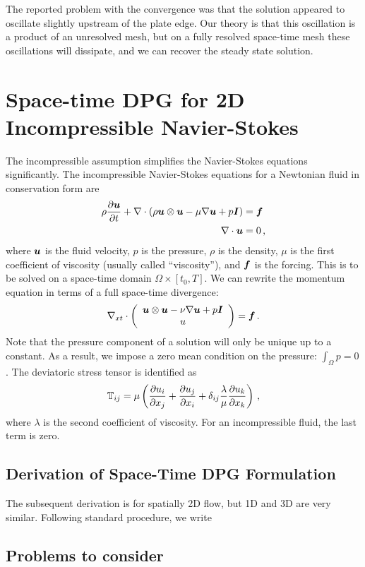 \documentclass[Proposal.tex]{subfiles}
\begin{document}
The reported problem with the convergence was that the solution appeared to oscillate slightly upstream of the plate edge.
Our theory is that this oscillation is a product of an unresolved mesh, but on a fully resolved space-time mesh these oscillations will dissipate, 
and we can recover the steady state solution.

\section{Space-time DPG for 2D Incompressible Navier-Stokes}
The incompressible assumption simplifies the Navier-Stokes equations significantly.
The incompressible Navier-Stokes equations for a Newtonian fluid in conservation form are
\begin{align*}
  \rho\frac{\partial\boldsymbol u}{\partial t}+\nabla\cdot\left( \rho\boldsymbol u\otimes\boldsymbol u-\mu\nabla\boldsymbol u+p\boldsymbol I \right)&=\boldsymbol f\\
  \nabla\cdot\boldsymbol u&=0\,,
\end{align*}
where $\boldsymbol u$ is the fluid velocity, $p$ is the pressure, $\rho$ is the density, $\mu$ is the first coefficient of viscosity (usually called ``viscosity''), 
and $\boldsymbol f$ is the forcing. 
This is to be solved on a space-time domain $\Omega\times[t_0,T]$.
We can rewrite the momentum equation in terms of a full space-time divergence:
\begin{equation}
\nabla_{xt}\cdot\left( \begin{array}{c} \boldsymbol u\otimes\boldsymbol u-\nu\nabla\boldsymbol u+p\boldsymbol I\\ u\\ \end{array} \right)=\boldsymbol f\,.
\end{equation}
Note that the pressure component of a solution will only be unique up to a constant. 
As a result, we impose a zero mean condition on the pressure: $\int_\Omega p=0$.
The deviatoric stress tensor is identified as
\begin{equation}
	\mathbb{T}_{ij}=\mu\left( \frac{\partial u_i}{\partial x_j}+\frac{\partial u_j}{\partial x_i}
	+\delta_{ij}\frac{\lambda}{\mu}\frac{\partial u_k}{\partial x_k} \right)\,,
\end{equation}
where $\lambda$ is the second coefficient of viscosity.
For an incompressible fluid, the last term is zero.

\subsection{Derivation of Space-Time DPG Formulation}
The subsequent derivation is for spatially 2D flow, but 1D and 3D are very similar.
Following standard procedure, we write

\subsection{Problems to consider}
\end{document}
